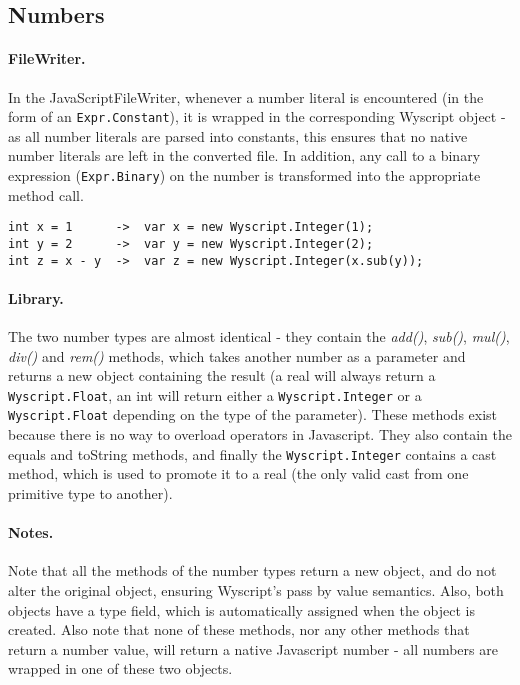 \subsection{Numbers}
\label{c_types_number}

\paragraph{FileWriter.} In the JavaScriptFileWriter, whenever a number literal is encountered (in the form of an \lstinline{Expr.Constant}), it is wrapped in the corresponding Wyscript object - as all number literals are parsed into constants, this ensures that no native number literals are left in the converted file. In addition, any call to a binary expression (\lstinline{Expr.Binary}) on the number is transformed into the appropriate method call.

\begin{lstlisting}
int x = 1      ->  var x = new Wyscript.Integer(1);
int y = 2      ->  var y = new Wyscript.Integer(2);
int z = x - y  ->  var z = new Wyscript.Integer(x.sub(y));
\end{lstlisting}

\paragraph{Library.} The two number types are almost identical - they contain the {\em add()}, {\em sub()}, {\em mul()}, {\em div()} and {\em rem()} methods, which takes another number as a parameter and returns a new object containing the result (a real will always return a \lstinline{Wyscript.Float}, an int will return either a \lstinline{Wyscript.Integer} or a \lstinline{Wyscript.Float} depending on the type of the parameter). These methods exist because there is no way to overload operators in Javascript. They also contain the equals and toString methods, and finally the \lstinline{Wyscript.Integer} contains a cast method, which is used to promote it to a real (the only valid cast from one primitive type to another).

\paragraph{Notes.} Note that all the methods of the number types return a new object, and do not alter the original object, ensuring Wyscript's pass by value semantics. Also, both objects have a type field, which is automatically assigned when the object is created. Also note that none of these methods, nor any other methods that return a number value, will return a native Javascript number - all numbers are wrapped in one of these two objects.

